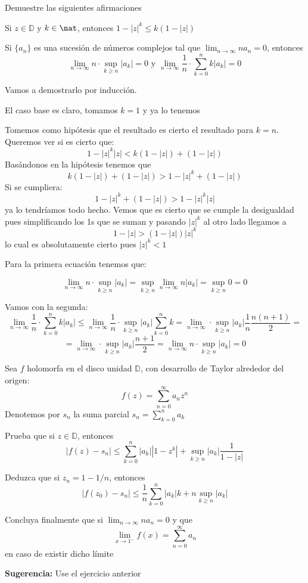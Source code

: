 \begin{problem}[21]
Demuestre las siguientes afirmaciones

\ppart Si $z \in \mathbb{D}$ y $k \in \nat$, entonces $1-|z|^k \leq k(1-|z|)$

\ppart Si $\{a_n\}$ es una sucesión de números complejos tal que $\lim_{n \to \infty} na_n=0$, entonces
\[\lim_{n\to \infty}n \cdot \sup_{k \geq n}|a_k| = 0 \text{  y  } \lim_{n \to \infty}\frac{1}{n}\cdot \sum_{k=0}^nk|a_k|=0\]

\solution
{}

\spart
Vamos a demostrarlo por inducción.

El caso base es claro, tomamos $k=1$ y ya lo tenemos

Tomemos como hipótesis que el resultado es cierto el resultado para $k=n$. Queremos ver si es cierto que:
\[1-|z|^k|z| < k(1-|z|)+(1-|z|)\]
Basándonos en la hipótesis tenemos que
\[ k(1-|z|)+(1-|z|) > 1-|z|^k+(1-|z|)\]
Si se cumpliera:
\[1-|z|^k+(1-|z|) > 1-|z|^k|z|\]
ya lo tendríamos todo hecho. Vemos que es cierto que se cumple la desigualdad pues simplificando los 1s que se suman y pasando $|z|^k$ al otro lado llegamos a
\[1-|z| > (1-|z|)|z|^k\]
lo cual es absolutamente cierto pues $|z|^k < 1$

\spart

Para la primera ecuación tenemos que:

\[\lim_{n\to \infty}n \cdot \sup_{k \geq n}|a_k| = \sup_{k \geq n} \lim_{n\to \infty}n |a_k| = \sup_{k \geq n} 0 = 0\]

Vamos con la segunda:
\[\lim_{n \to \infty}\frac{1}{n}\cdot \sum_{k=0}^nk|a_k| \leq \lim_{n \to \infty}\frac{1}{n}\cdot \sup_{k \geq n}|a_k| \sum_{k=0}^nk = \lim_{n \to \infty}\cdot \sup_{k \geq n}|a_k| \frac{1}{n} \frac{n(n+1)}{2}=\]
\[=\lim_{n \to \infty}\cdot \sup_{k \geq n}|a_k|\frac{n+1}{2} = \lim_{n\to \infty}n \cdot \sup_{k \geq n}|a_k| = 0\]
\end{problem}

\begin{problem}[22]
Sea $f$ holomorfa en el disco unidad $\mathbb{D}$, con desarrollo de Taylor alrededor del origen:
\[f(z)=\sum_{n=0}^{\infty}a_nz^n\]
Denotemos por $s_n$ la suma parcial $s_n=\sum_{k=0}^n a_k$

\ppart Prueba que si $z \in \mathbb{D}$, entonces
\[|f(z)-s_n| \leq \sum_{k=0}^n|a_k||1-z^k|+\sup_{k \geq n}|a_k|\frac{1}{1-|z|}\]

\ppart Deduzca que si $z_n=1-1/n$, entonces
\[|f(z_0)-s_n|\leq \frac{1}{n}\sum_{k=0}^n |a_k|k+n\sup_{k \geq n}|a_k|\]

\ppart Concluya finalmente que si $\lim_{n\to\infty}na_n=0$ y que
\[\lim_{x \to 1^-}f(x) = \sum_{n=0}^{\infty}a_n\]
en caso de existir dicho límite


\textbf{Sugerencia:} Use el ejercicio anterior
\solution

\end{problem}
\newpage

